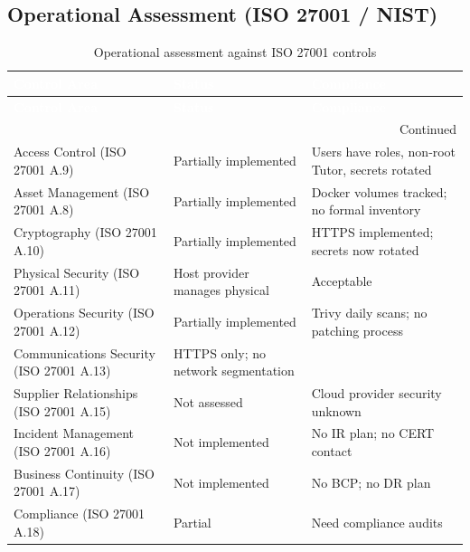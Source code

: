\subsection{Operational Assessment (ISO 27001 / NIST)}
\begin{center}
\begin{longtable}{|p{}|p{}|p{}|}
\caption[ISO 27001 Assessment]{Operational assessment against ISO 27001 controls}
\label{tab:iso27001} \\
\hline
\rowcolor{mooveblue}
\textcolor{white}{\textbf{Control Area}} & \textcolor{white}{\textbf{Status}} & \textcolor{white}{\textbf{Compliance}} \\
\hline
\endfirsthead
\hline
\rowcolor{mooveblue}
\textcolor{white}{\textbf{Control Area}} & \textcolor{white}{\textbf{Status}} & \textcolor{white}{\textbf{Compliance}} \\
\hline
\endhead
\hline
\multicolumn{3}{|r|}{Continued} \\
\hline
\endfoot
\hline
\endlastfoot
Access Control (ISO 27001 A.9) & Partially implemented & Users have roles, non‑root Tutor, secrets rotated \\
Asset Management (ISO 27001 A.8) & Partially implemented & Docker volumes tracked; no formal inventory \\
Cryptography (ISO 27001 A.10) & Partially implemented & HTTPS implemented; secrets now rotated \\
Physical Security (ISO 27001 A.11) & Host provider manages physical & Acceptable \\
Operations Security (ISO 27001 A.12) & Partially implemented & Trivy daily scans; no patching process \\
Communications Security (ISO 27001 A.13) & HTTPS only; no network segmentation & \\
Supplier Relationships (ISO 27001 A.15) & Not assessed & Cloud provider security unknown \\
Incident Management (ISO 27001 A.16) & Not implemented & No IR plan; no CERT contact \\
Business Continuity (ISO 27001 A.17) & Not implemented & No BCP; no DR plan \\
Compliance (ISO 27001 A.18) & Partial & Need compliance audits \\
\hline
\end{longtable}
\end{center}

